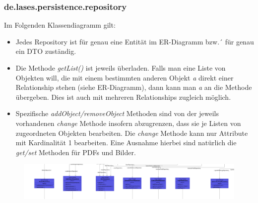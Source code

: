
\subsubsection{de.lases.persistence.repository}

Im Folgenden Klassendiagramm gilt:
\begin{itemize}
	\item Jedes Repository ist für genau eine Entität im ER-Diagramm bzw.´ für genau ein DTO zuständig.
	\item Die Methode \emph{getList()} ist jeweils überladen. Falls man eine Liste von Objekten will, die mit einem bestimmten anderen Objekt \emph{a} direkt einer Relationship stehen (siehe ER-Diagramm), dann kann man \emph{a} an die Methode übergeben. Dies ist auch mit mehreren Relationships zugleich möglich.
	\item Spezifische \emph{addObject/removeObject} Methoden sind von der jeweils vorhandenen \emph{change} Methode insofern abzugrenzen, dass sie je Listen von zugeordneten Objekten bearbeiten. Die \emph{change} Methode kann nur Attribute mit Kardinalität 1 bearbeiten. Eine Ausnahme hierbei sind natürlich die \emph{get/set} Methoden für PDFs und Bilder.
\end{itemize}

\begin{figure}[H]
	\centering
	\includegraphics[width=0.9\linewidth]{graphics/persistence_repository}
\end{figure}


